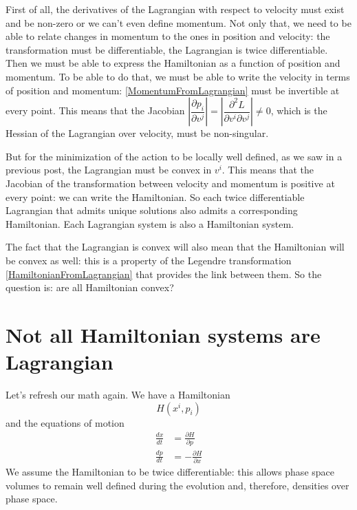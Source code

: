 \documentclass[aps,pra,10pt,floatfix,nofootinbib]{revtex4-1}
\theoremstyle{definition}
\begin{document}
First of all, the derivatives of the Lagrangian with respect to velocity must exist and be non-zero or we can't even define momentum. Not only that, we need to be able to relate changes in momentum to the ones in position and velocity: the transformation must be differentiable, the Lagrangian is twice differentiable. Then we must be able to express the Hamiltonian as a function of position and momentum. To be able to do that, we must be able to write the velocity in terms of position and momentum: \eqref{MomentumFromLagrangian} must be invertible at every point. This means that the  Jacobian $\left| \dfrac{\partial p_i}{\partial v^j} \right| = \left| \dfrac{\partial^2 L}{\partial v^i \partial v^j} \right| \neq 0$, which is the Hessian of the Lagrangian over velocity, must be non-singular.

But for the minimization of the action to be locally well defined, as we saw in a previous post, the Lagrangian must be convex in $v^i$. This means that the Jacobian of the transformation between velocity and momentum is positive at every point: we can write the Hamiltonian. So each twice differentiable Lagrangian that admits unique solutions also admits a corresponding Hamiltonian. Each Lagrangian system is also a Hamiltonian system.

The fact that the Lagrangian is convex will also mean that the Hamiltonian will be convex as well: this is a property of the Legendre transformation \eqref{HamiltonianFromLagrangian} that provides the link between them. So the question is: are all Hamiltonian convex?

\section{Not all Hamiltonian systems are Lagrangian}

Let's refresh our math again. We have a Hamiltonian
\begin{equation}
\label{Hamiltonian}
H(x^i, p_i)
\end{equation}
and the equations of motion
\begin{equation}
\begin{aligned}
\frac{dx}{dt} &= \frac{\partial H}{\partial p} \\
\frac{dp}{dt} &= - \frac{\partial H}{\partial x}
\end{aligned}
\label{HamiltonEquations}
\end{equation}
We assume the Hamiltonian to be twice differentiable: this allows phase space volumes to remain well defined during the evolution and, therefore, densities over phase space.
\end{document}
